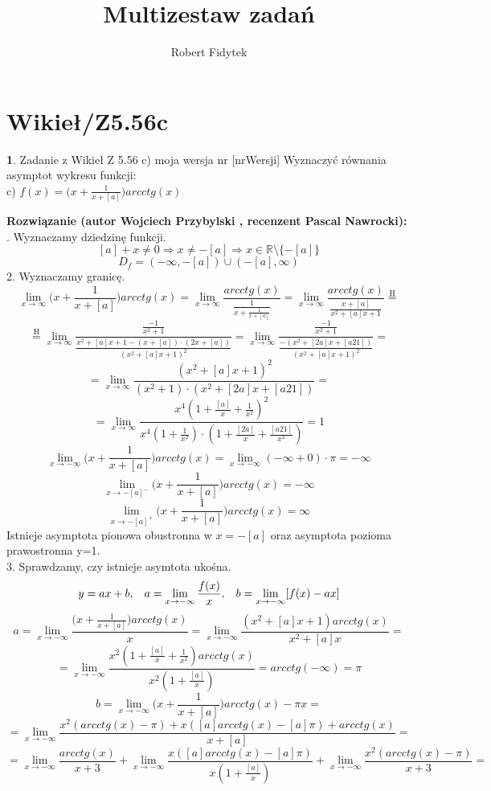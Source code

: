 \documentclass[12pt, a4paper]{article}
\title{Multizestaw zadań}
\author{Robert Fidytek}
\date{}
\theoremstyle{definition} %
\newtheorem{zad}{}
\newcommand{\kategoria}[1]{\section{#1}} %
\newcommand{\zadStart}[1]{\begin{zad}#1\newline} %
\newcommand{\zadStop}{\end{zad}}   %
\newcommand{\rozwStart}[2]{\noindent \textbf{Rozwiązanie (autor #1 , recenzent #2): }\newline} %
\begin{document}
\maketitle


\kategoria{Wikieł/Z5.56c}
\zadStart{Zadanie z Wikieł Z 5.56 c) moja wersja nr [nrWersji]}
Wyznaczyć równania asymptot wykresu funkcji:\\
c) $f(x)=\big( x+\frac{1}{x+[a]}\big) arcctg(x)$
\zadStop
\rozwStart{Wojciech Przybylski}{Pascal Nawrocki}
1. Wyznaczamy dziedzinę funkcji.
$$[a]+x\neq0 \Rightarrow x\neq-[a] \Rightarrow x\in\mathbb{R}\setminus\{-[a]\}$$
$$D_{f}=(-\infty,-[a])\cup(-[a],\infty)$$
2. Wyznaczamy granicę. 
$$\lim_{x\to\infty}\big( x+\frac{1}{x+[a]}\big) arcctg(x)=\lim_{x\to\infty}\frac{arcctg(x)}{\frac{1}{x+\frac{1}{x+[a]}}}=\lim_{x\to\infty}\frac{arcctg(x)}{\frac{x+[a]}{x^{2}+[a]x+1}}\stackrel{\text{H}}{=}$$
$$\stackrel{\text{H}}{=}\lim_{x\to\infty}\frac{\frac{-1}{x^{2}+1}}{\frac{x^{2}+[a]x+1-(x+[a])\cdot(2x+[a])}{(x^{2}+[a]x+1)^{2}}}=\lim_{x\to\infty}\frac{\frac{-1}{x^{2}+1}}{\frac{-(x^{2}+[2a]x+[a21])}{(x^{2}+[a]x+1)^{2}}}=$$
$$=\lim_{x\to\infty}\frac{(x^{2}+[a]x+1)^{2}}{(x^{2}+1)\cdot(x^{2}+[2a]x+[a21])}=$$
$$=\lim_{x\to\infty}\frac{x^{4}(1+\frac{[a]}{x}+\frac{1}{x^{2}})^{2}}{x^{4}(1+\frac{1}{x^{2}})\cdot(1+\frac{[2a]}{x}+\frac{[a21]}{x^{2}})}=1$$
$$\lim_{x\to-\infty}\big( x+\frac{1}{x+[a]}\big) arcctg(x)=\lim_{x\to-\infty}(-\infty+0)\cdot\pi=-\infty$$
$$\lim_{x\to-[a]^{-}}\big( x+\frac{1}{x+[a]}\big) arcctg(x)=-\infty$$
$$\lim_{x\to-[a]^{+}}\big( x+\frac{1}{x+[a]}\big) arcctg(x)=\infty$$
Istnieje asymptota pionowa obustronna w $x=-[a]$ oraz asymptota pozioma prawostronna y=1.\\
3. Sprawdzamy, czy istnieje asymtota ukośna.
$$y=ax+b,\hspace{3mm}a=\lim_{x\to-\infty}\frac{f(x)}{x},\hspace{3mm}b=\lim_{x\to-\infty}[f(x)-ax]$$
$$a=\lim_{x\to-\infty}\frac{\big( x+\frac{1}{x+[a]}\big) arcctg(x)}{x}=\lim_{x\to-\infty}\frac{(x^{2}+[a]x+1)arcctg(x)}{x^{2}+[a]x}=$$
$$=\lim_{x\to-\infty}\frac{x^{2}(1+\frac{[a]}{x}+\frac{1}{x^{2}})arcctg(x)}{x^{2}(1+\frac{[a]}{x})}=arcctg(-\infty)=\pi$$
$$b=\lim_{x\to-\infty}\big( x+\frac{1}{x+[a]}\big)arcctg(x)-\pi x=$$
$$=\lim_{x\to-\infty}\frac{x^{2}(arcctg(x)-\pi)+x([a]arcctg(x)-[a]\pi)+arcctg(x)}{x+[a]}=$$
$$=\lim_{x\to-\infty}\frac{arcctg(x)}{x+3}+\lim_{x\to-\infty}\frac{x([a]arcctg(x)-[a]\pi)}{x(1+\frac{[a]}{x})}+\lim_{x\to-\infty}\frac{x^{2}(arcctg(x)-\pi)}{x+3}=$$
\end{document}
